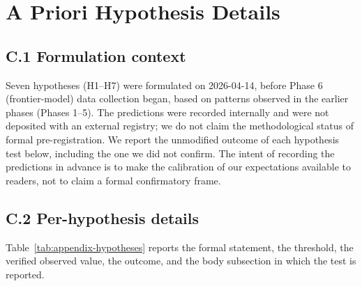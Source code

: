 
\clearpage
\section{A Priori Hypothesis Details}
\label{app:hypotheses}

\subsection*{C.1 Formulation context}

Seven hypotheses (H1--H7) were formulated on 2026-04-14, before Phase
6 (frontier-model) data collection began, based on patterns observed
in the earlier phases (Phases 1--5). The predictions were recorded
internally and were not deposited with an external registry; we do
not claim the methodological status of formal pre-registration. We
report the unmodified outcome of each hypothesis test below, including
the one we did not confirm. The intent of recording the predictions
in advance is to make the calibration of our expectations available
to readers, not to claim a formal confirmatory frame.

\subsection*{C.2 Per-hypothesis details}

Table~\ref{tab:appendix-hypotheses} reports the formal statement, the
threshold, the verified observed value, the outcome, and the body
subsection in which the test is reported.

